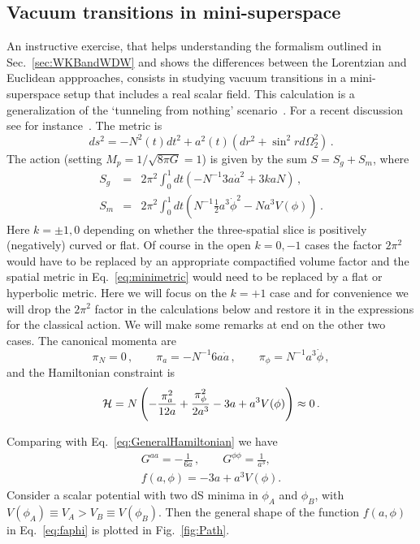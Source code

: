 \documentclass[a4paper,11pt]{article}
\numberwithin{equation}{section}
\begin{document}
\subsection{Vacuum transitions in mini-superspace}
\label{sec:CDLfromWDW}

An instructive exercise, that helps understanding the formalism outlined in Sec.~\ref{sec:WKBandWDW} and shows the differences between the Lorentzian and Euclidean appproaches, consists in studying vacuum transitions in a mini-superspace setup that includes a real scalar field. This calculation is a generalization of the ‘tunneling from nothing’ scenario~\cite{Vilenkin:1982de, Hartle:1983ai, Vilenkin:1984wp,Linde:1983mx}. For a recent discussion see for instance~\cite{Kristiano:2018oyv,deAlwis:2018sec,Halliwell:2018ejl}. The metric is 
\begin{equation}
ds^{2}=-N^{2}(t)dt^{2}+a^{2}(t)(dr^{2}+\sin^{2}rd\Omega_{2}^{2}) \,. \label{eq:minimetric}
\end{equation}
The action (setting $M_p=1/\sqrt{8\pi G}=1$) is given by the sum $S=S_{g}+S_{m}$, where 
\begin{eqnarray}
S_{g} & = & 2\pi^{2}\int_{0}^{1}dt\left(-N^{-1}3a\dot{a}^{2}+3kaN\right) \,,\label{eq:Sg}\\
S_{m} & = & 2\pi^{2}\int_{0}^{1}dt\left(N^{-1}\frac{1}{2}a^{3}\dot{\phi}^{2}-Na^{3}V(\phi)\right) \,.
\end{eqnarray}
Here $k=\pm1,0$ depending on whether the three-spatial slice is positively (negatively)
curved or flat. Of course  in the open $k=0,-1$ cases the factor $2\pi^{2}$ would have to be replaced by an appropriate compactified volume factor and the spatial metric in Eq.~\eqref{eq:minimetric} would need to be replaced by a flat or hyperbolic metric. Here we will focus on the $k=+1 $ case and for  convenience we will drop the $2\pi^{2}$ factor in the calculations below and restore it in the expressions for the classical action. We will make some remarks at end on the other two cases. The canonical momenta are
\begin{equation}
\pi_{N}=0\,, \qquad \pi_{a}=-N^{-1}6a\dot{a} \,,\qquad \pi_{\phi}=N^{-1}a^{3}\dot{\phi} \,,\label{eq:momenta}
\end{equation}
and the Hamiltonian constraint is 
\begin{equation}
{\cal H}=N\left(-\frac{\pi_{a}^{2}}{12a}+\frac{\pi_{\phi}^{2}}{2a^{3}}-3a+a^{3}V(\phi)\right)\approx 0 \,.\label{eq:calH}
\end{equation}


Comparing with Eq.~\eqref{eq:GeneralHamiltonian} we have
\begin{gather}
G^{aa} = -\frac{1}{6a} \,,\qquad G^{\phi\phi}=\frac{1}{a^{3}},\label{eq:G-1}\\
f(a,\phi) = -3a+a^{3}V(\phi).\label{eq:faphi}
\end{gather}
Consider a scalar potential with two dS minima in $\phi_A$ and $\phi_B$, with $V(\phi_A) \equiv V_A > V_B \equiv V(\phi_B)$. Then the general shape of the function $f(a, \phi)$ in Eq.~\eqref{eq:faphi} is plotted in Fig.~\ref{fig:Path}.
\end{document}
